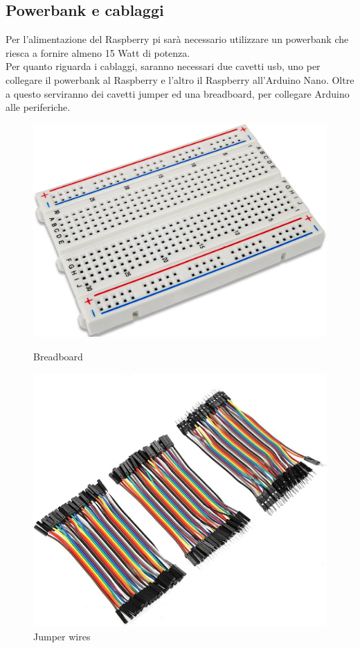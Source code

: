 \documentclass[12pt]{report}
\begin{document}
\subsection*{Powerbank e cablaggi}

Per l'alimentazione del Raspberry pi sarà necessario utilizzare un powerbank che riesca a fornire almeno 15 Watt di potenza.\\
Per quanto riguarda i cablaggi, saranno necessari due cavetti usb, uno per collegare il powerbank al Raspberry e l'altro il Raspberry all'Arduino Nano. Oltre a questo serviranno dei cavetti jumper ed una breadboard, per collegare Arduino alle periferiche.

\begin{figure}[!h]
    \centering
    \begin{minipage}{.5\textwidth}
        \centering
        \includegraphics[width=0.85\linewidth, height=0.18\textheight]{images/components/breadboard.jpg}
        \caption{Breadboard}
    \end{minipage}%
    \begin{minipage}{0.5\textwidth}
        \centering
        \includegraphics[width=0.65\linewidth, height=0.18\textheight]{images/components/jumpers.jpg}
        \caption{Jumper wires}
    \end{minipage}
\end{figure}
\end{document}
